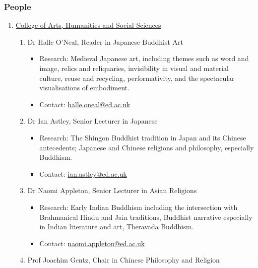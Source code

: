 \documentclass[a4paper,10.5pt]{article}
\begin{document}
\subsubsection{People}
\label{sec:orgc84ad11}
\begin{enumerate}
\item \href{https://www.ed.ac.uk/arts-humanities-soc-sci}{College of Arts, Humanities and Social Sciences}
\label{sec:org7088405}
\begin{enumerate}
\item Dr Halle O’Neal, Reader in Japanese Buddhist Art
\label{sec:org5b25688}
\begin{itemize}
\item Research: Medieval Japanese art, including themes such as word and image, relics and reliquaries, invisibility in visual and material culture, reuse and recycling, performativity, and the spectacular visualisations of embodiment.\\
\item Contact: \href{mailto:halle.oneal@ed.ac.uk}{halle.oneal@ed.ac.uk}\\
\end{itemize}
\item Dr Ian Astley, Senior Lecturer in Japanese
\label{sec:org92c0561}
\begin{itemize}
\item Research: The Shingon Buddhist tradition in Japan and its Chinese antecedents; Japanese and Chinese religions and philosophy, especially Buddhism.\\
\item Contact: \href{mailto:ian.astley@ed.ac.uk}{ian.astley@ed.ac.uk}\\
\end{itemize}
\item Dr Naomi Appleton, Senior Lecturer in Asian Religions
\label{sec:org838d3ba}
\begin{itemize}
\item Research: Early Indian Buddhism including the intersection with Brahmanical Hindu and Jain traditions, Buddhist narrative especially in Indian literature and art, Theravada Buddhism.\\
\item Contact: \href{mailto:naomi.appleton@ed.ac.uk}{naomi.appleton@ed.ac.uk}\\
\end{itemize}
\item Prof Joachim Gentz, Chair in Chinese Philosophy and Religion
\label{sec:orgece79a5}
\begin{itemize}

\end{itemize}
\end{enumerate}
\end{enumerate}
\end{document}
